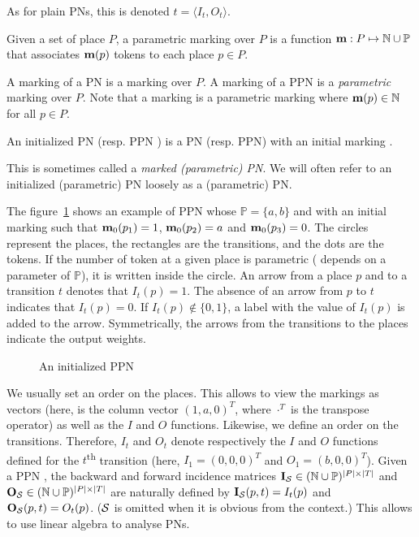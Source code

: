 As for plain \acp{PN}, this is denoted $t = \langle I_t, O_t \rangle$.

\begin{defi}
  Given a set of place $P$, a parametric marking over $P$ is a function $\mathbf{m} : P \mapsto \mathbb{N} \cup \mathbb{P} $ that associates $\mathbf{m}(p)$ tokens to each place $p \in P$.
\end{defi}

A marking of a \ac{PN} \NPT is a marking over $P$.
A marking of a \ac{PPN} \SPTP is a \emph{parametric} marking over $P$.
Note that a marking \marq is a parametric marking where $\mathbf{m}(p) \in \mathbb{N}$ for all $p \in P$.

\begin{defi}
  An initialized \ac{PN} \NPTm (resp. \ac{PPN} \SPTPm) is a \ac{PN} (resp. \ac{PPN}) with an initial marking \marqi.
\end{defi}

This is sometimes called a \emph{marked (parametric) \ac{PN}}.
We will often refer to an initialized (parametric) \ac{PN} loosely as a (parametric) \ac{PN}.

The figure~\ref{fig:parametric-petri-net-example} shows an example of \ac{PPN} whose $\mathbb{P} = \{a, b\}$ and with an initial marking \marqi such that $\mathbf{m}_0(p_1) = 1$, $\mathbf{m}_0(p_2) = a$ and $\mathbf{m}_0(p_3) = 0$. The circles represent the places, the rectangles are the transitions, and the dots are the tokens. If the number of token at a given place is parametric ( depends on a parameter of $\mathbb{P}$), it is written inside the circle. An arrow from a place $p$ and to a transition $t$ denotes that $I_t(p) = 1$. The absence of an arrow from $p$ to $t$ indicates that $I_t(p) = 0$. If $I_t(p) \notin \{0, 1\}$, a label with the value of $I_t(p)$ is added to the arrow.
Symmetrically, the arrows from the transitions to the places indicate the output weights.

\begin{figure}[h]
  \centering
  
  \par
  \caption{An initialized \ac{PPN}}
  \label{fig:parametric-petri-net-example}
\end{figure}

We usually set an order on the places.
This allows to view the markings as vectors (here, \marqi is the column vector $(1, a, 0)^T$, where $\cdot^T$ is the transpose operator) as well as the $I$ and $O$ functions.
Likewise, we define an order on the transitions.
Therefore, $I_t$ and $O_t$ denote respectively the $I$ and $O$ functions defined for the $t$\textsuperscript{th} transition (here, $I_1 = (0, 0, 0)^T$ and $O_1 = (b, 0, 0)^T$).
Given a \ac{PPN} \SPTP, the backward and forward incidence matrices $\mathbf{I}_\mathcal{S} \in (\mathbb{N} \cup \mathbb{P})^{|P|\times|T|}$ and $\mathbf{O}_\mathcal{S} \in (\mathbb{N} \cup \mathbb{P})^{|P|\times|T|}$ are naturally defined by $\mathbf{I}_\mathcal{S}(p, t) = I_t(p)$ and $\mathbf{O}_\mathcal{S}(p, t) = O_t(p)$.
($\mathcal{S}$ is omitted when it is obvious from the context.)
This allows to use linear algebra to analyse \acp{PN}.

